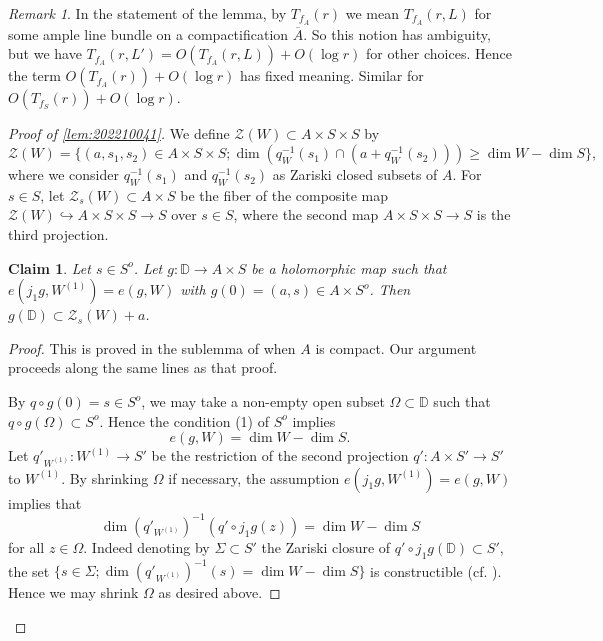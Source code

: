 \documentclass[11pt,english]{smfart}
\theoremstyle{plain}
\newtheorem{claim}[thm]{Claim}
\theoremstyle{definition}
\theoremstyle{remark}
\newtheorem{rem}[thm]{Remark}
\numberwithin{equation}{section}
\theoremstyle{plain}
\begin{document}
	\begin{rem}
		In the statement of the lemma, by $T_{f_A}(r)$ we mean $T_{f_A}(r,L)$ for some ample line bundle on a compactification $\overline{A}$.
		So this notion has ambiguity, but we have $T_{f_A}(r,L')=O(T_{f_A}(r,L))+O(\log r)$ for other choices.
		Hence the term $O(T_{f_A}(r))+O(\log r)$ has fixed meaning.
		Similar for $O(T_{f_S}(r))+O(\log r)$.
	\end{rem}
	
	\begin{proof}[Proof of \cref{lem:202210041}]
		We define $\mathcal{Z}(W)\subset A\times S\times S$ by
		$$
		\mathcal{Z}(W)=\{ (a,s_1,s_2)\in A\times S\times S;\dim (q_W^{-1}(s_1)\cap (a+q_W^{-1}(s_2)))\geq \dim W-\dim S\} ,
		$$
		where we consider $q_W^{-1}(s_1)$ and $q_W^{-1}(s_2)$ as Zariski closed subsets of $A$.
		For $s\in S$, let $\mathcal{Z}_{s}(W)\subset A\times S$ be the fiber of the composite map $\mathcal{Z}(W)\hookrightarrow A\times S\times S\to S$ over $s\in S$, where the second map $A\times S\times S\to S$ is the third projection.
		
		
		
		\begin{claim}\label{claim:20221018}
			Let $s\in S^o$.
			Let $g:\mathbb D \to A\times S$ be a holomorphic map such that $e(j_1g,W^{(1)})=e(g,W)$ with $g(0)=(a,s)\in A\times S^o$.
			Then $g(\mathbb D )\subset \mathcal{Z}_{s}(W)+a$.
		\end{claim}
		
		\begin{proof}
			This is proved in the sublemma of \cite[Lemma 3]{Yam15} when $A$ is compact.
Our argument proceeds along the same lines as that proof.
			
			By $q\circ g(0)=s\in S^o$, we may take a non-empty open subset $\Omega\subset \mathbb D$ such that $q\circ g(\Omega)\subset S^o$. 
		Hence the condition (1) of $S^o$ implies 
		$$e(g,W)=\dim W-\dim S.$$
Let $q'_{W^{(1)}}:W^{(1)}\to S'$ be the restriction of the second projection $q':A\times S'\to S'$ to $W^{(1)}$.
By shrinking $\Omega$ if necessary, the assumption $e(j_1g,W^{(1)})=e(g,W)$ implies that
\begin{equation*}
\dim (q'_{W^{(1)}})^{-1}(q'\circ j_1g(z))=\dim W-\dim S
\end{equation*}
for all $z\in \Omega$.
Indeed denoting by $\Sigma\subset S'$ the Zariski closure of $q'\circ j_1g(\mathbb D)\subset S'$, the set $\{s\in \Sigma; \dim (q'_{W^{(1)}})^{-1}(s)=\dim W-\dim S\}$ is constructible (cf. \cite[Tag 05F9]{stacks-project}).
Hence we may shrink $\Omega$ as desired above.



\end{proof}
\end{proof}
\end{document}

